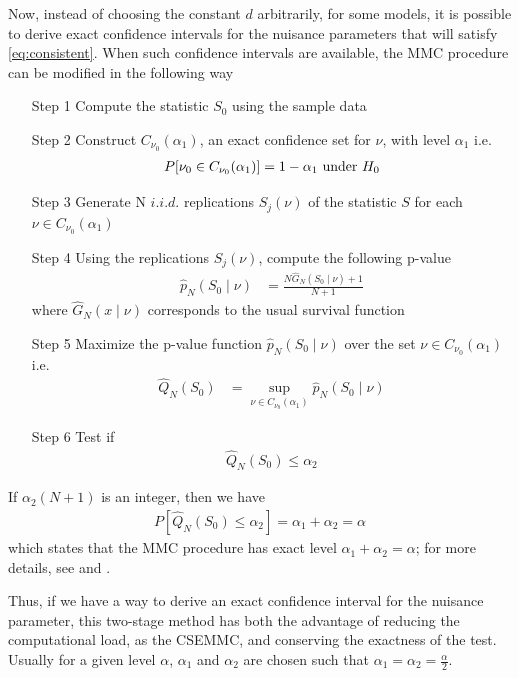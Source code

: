 \documentclass[]{article}\usepackage[]{graphicx}\usepackage[]{color}
\begin{document}
Now, instead of choosing the constant $d$ arbitrarily, for some models, it is possible to derive exact confidence intervals for the nuisance parameters that will satisfy \ref{eq:consistent}. When such confidence intervals are available, the MMC procedure can be modified in the following way
\begin{itemize}
	\item[Step 1] Compute the statistic $S_0$ using the sample data
	\item[Step 2] Construct $C_{\nu_0}(\alpha_1)$, an exact confidence set for $\nu$, with level $\alpha_1$ i.e.
	\begin{align}
	P[\nu_0 \in C_{\nu_0}(\alpha_1)] = 1 - \alpha_1 \textnormal{ under } H_0
	\end{align}
	\item[Step 3] Generate N $i.i.d.$ replications $S_{j}(\nu)$ of the statistic $S$ for each $\nu \in C_{\nu_0}(\alpha_1)$
	\item[Step 4] Using the replications $S_{j}(\nu)$, compute the following p-value
	\begin{align}
	\hat{p}_{N}(S_{0} \mid \nu) & = \frac{N\hat{G}_{N}(S_{0} \mid \nu)+1}{N+1}
	\end{align}
	where $\hat{G}_{N}(x \mid \nu)$ corresponds to the usual survival function

	\item[Step 5] Maximize the p-value function $\hat{p}_{N}(S_{0} \mid \nu)$ over the set $\nu \in C_{\nu_0}(\alpha_1)$ i.e.
	\begin{align}
	\hat{Q}_{N}(S_0) & = \sup_{\nu \in  C_{\nu_0}(\alpha_1)} \hat{p}_{N}(S_{0} \mid \nu)
	\end{align}

	\item[Step 6] Test if
	\begin{align}
	\hat{Q}_{N}(S_{0})\leq \alpha_2
	\end{align}
\end{itemize}

If $\alpha_2(N+1)$ is an integer, then we have
\begin{align}
P [\hat{Q}_{N}(S_{0}) \leq \alpha_2] = \alpha_1+\alpha_2 = \alpha
\end{align}
which states that the MMC procedure has exact level $\alpha_1 + \alpha_2 = \alpha$; for more details, see \cite{dufour_exact_1996} and \cite{dufour_monte_2006}.

Thus, if we have a way to derive an exact confidence interval for the nuisance parameter, this two-stage method has both the advantage of reducing the computational load, as the CSEMMC, and conserving the exactness of the test. Usually for a given level $\alpha$, $\alpha_1$ and $\alpha_2$ are chosen such that $\alpha_1=\alpha_2=\frac{\alpha}{2}$.
\end{document}
